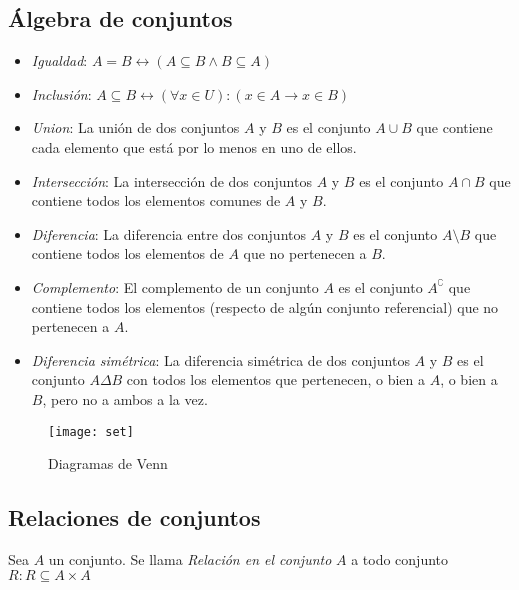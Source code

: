 \documentclass[a4paper, twoside]{article}
\begin{document}
	\subsection{Álgebra de conjuntos}
	\begin{itemize}
		\item \emph{Igualdad}: $ A = B \leftrightarrow (A \subseteq B \wedge B \subseteq A)$	
		\item \emph{Inclusión}: $A \subseteq B \leftrightarrow (\forall x \in U):(x \in A \rightarrow x \in B)$	
		\item \emph{Union}: La unión de dos conjuntos $A$ y $B$ es el conjunto $A \cup B$ que contiene cada elemento que está por lo menos en uno de ellos.

		\item \emph{Intersección}: La intersección de dos conjuntos $A$ y $B$ es el conjunto $A \cap B$ que contiene todos los elementos comunes de $A$ y $B$.

		\item \emph{Diferencia}:  La diferencia entre dos conjuntos $A$ y $B$ es el conjunto $A \setminus B$ que contiene todos los elementos de $A$ que no pertenecen a $B$.

		\item \emph{Complemento}: El complemento de un conjunto $A$ es el conjunto $A^\complement$ que contiene todos los elementos (respecto de algún conjunto referencial) que no pertenecen a $A$.

		\item \emph{Diferencia simétrica}: La diferencia simétrica de dos conjuntos $A$ y $B$ es el conjunto $A \Delta B$ con todos los elementos que pertenecen, o bien a $A$, o bien a $B$, pero no a ambos a la vez.
	\end{itemize}
	
	\begin{figure}
		\centering
		\texttt{[image: set]}
		\caption{Diagramas de Venn}
		\label{fig:set}
	\end{figure}
	
	\subsection{Relaciones de conjuntos}
	Sea $A$ un conjunto. Se llama \emph{Relación en el conjunto} $A$ a todo conjunto $R:R \subseteq A \times A$
	
\end{document}
